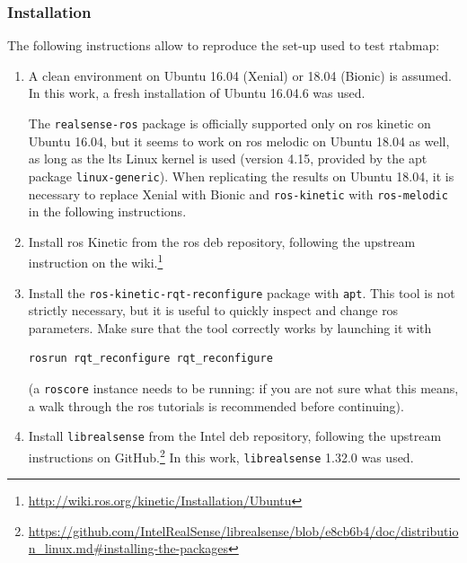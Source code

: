 \documentclass[11pt, letterpaper, twoside]{article}
\begin{document}
\subsubsection{Installation}

The following instructions allow to reproduce the set-up used to test
\gls{rtabmap}:
\begin{enumerate}

    \item A clean environment on Ubuntu 16.04 (Xenial) or 18.04 (Bionic) is
        assumed. In this work, a fresh installation of Ubuntu 16.04.6 was used.

        The \texttt{realsense-ros} package is officially supported only on
        \gls{ros} kinetic on Ubuntu 16.04, but it seems to work on \gls{ros}
        melodic on Ubuntu 18.04 as well, as long as the \gls{lts} Linux kernel
        is used (version 4.15, provided by the apt package
        \texttt{linux-generic}). When replicating the results on Ubuntu 18.04,
        it is necessary to replace Xenial with Bionic and \texttt{ros-kinetic}
        with \texttt{ros-melodic} in the following instructions.

    \item Install \gls{ros} Kinetic from the \gls{ros} deb repository,
        following the upstream instruction on the
        wiki.\footnote{\url{http://wiki.ros.org/kinetic/Installation/Ubuntu}}

    \item Install the \texttt{ros-kinetic-rqt-reconfigure} package with
        \texttt{apt}. This tool is not strictly necessary, but it is useful to
        quickly inspect and change \gls{ros} parameters. Make sure that the
        tool correctly works by launching it with
\begin{Verbatim}[samepage=true]
    rosrun rqt_reconfigure rqt_reconfigure
\end{Verbatim}
        (a \texttt{roscore} instance needs to be running: if you are not sure
        what this means, a walk through the \gls{ros} tutorials is recommended
        before continuing).

    \item Install \texttt{librealsense} from the Intel deb repository,
        following the upstream instructions on
        GitHub.\footnote{\url{https://github.com/IntelRealSense/librealsense/blob/e8cb6b4/doc/distribution_linux.md\#installing-the-packages}}
        In this work, \texttt{librealsense} 1.32.0 was used.


\end{enumerate}
\end{document}
